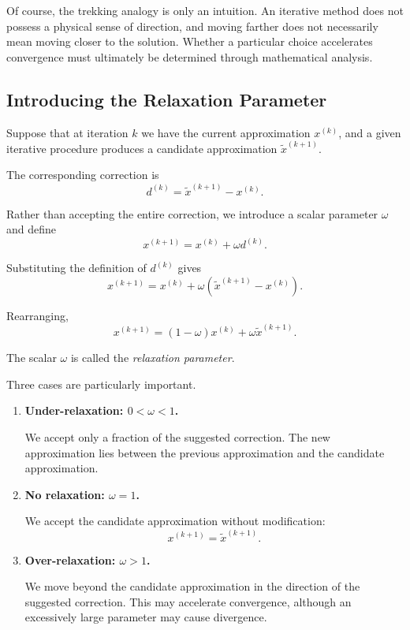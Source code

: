\documentclass[11pt,a4paper]{article}
\theoremstyle{definition}
\theoremstyle{remark}
\begin{document}
Of course, the trekking analogy is only
an intuition. An iterative method does
not possess a physical sense of direction,
and moving farther does not necessarily
mean moving closer to the solution.
Whether a particular choice accelerates
convergence must ultimately be determined
through mathematical analysis.


\subsection{Introducing the Relaxation Parameter}

Suppose that at iteration $k$ we have
the current approximation $x^{(k)}$,
and a given iterative procedure produces
a candidate approximation
$\widetilde{x}^{(k+1)}$.

The corresponding correction is
\[
    d^{(k)}
    =
    \widetilde{x}^{(k+1)}-x^{(k)}.
\]

Rather than accepting the entire
correction, we introduce a scalar
parameter $\omega$ and define
\begin{equation}
    x^{(k+1)}
    =
    x^{(k)}
    +
    \omega d^{(k)}.
    \label{eq:relaxation_correction}
\end{equation}

Substituting the definition of
$d^{(k)}$ gives
\[
    x^{(k+1)}
    =
    x^{(k)}
    +
    \omega
    \left(
        \widetilde{x}^{(k+1)}
        -
        x^{(k)}
    \right).
\]

Rearranging,
\begin{equation}
    \boxed{
    x^{(k+1)}
    =
    (1-\omega)x^{(k)}
    +
    \omega\widetilde{x}^{(k+1)}.
    }
    \label{eq:relaxation_general}
\end{equation}

The scalar $\omega$ is called the
\emph{relaxation parameter}.

Three cases are particularly important.

\begin{enumerate}
    \item \textbf{Under-relaxation:
    $0<\omega<1$.}

    We accept only a fraction of the
    suggested correction. The new
    approximation lies between the
    previous approximation and the
    candidate approximation.

    \item \textbf{No relaxation:
    $\omega=1$.}

    We accept the candidate approximation
    without modification:
    \[
        x^{(k+1)}
        =
        \widetilde{x}^{(k+1)}.
    \]

    \item \textbf{Over-relaxation:
    $\omega>1$.}

    We move beyond the candidate
    approximation in the direction
    of the suggested correction.
    This may accelerate convergence,
    although an excessively large
    parameter may cause divergence.
\end{enumerate}
\end{document}
